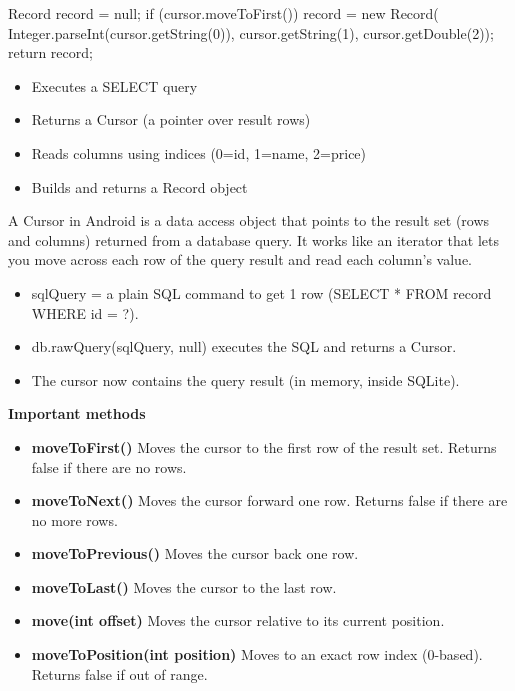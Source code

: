 \documentclass{report}
\begin{document}
\begin{itemize}
\begin{javacode}
{                    Record record = null;
                    if (cursor.moveToFirst())
                        record = new Record(
                            Integer.parseInt(cursor.getString(0)),
                            cursor.getString(1),
                            cursor.getDouble(2));
                    return record;
                }
            \end{javacode}
            \begin{itemize}
                \item Executes a SELECT query
                \item Returns a Cursor (a pointer over result rows)
                \item Reads columns using indices (0=id, 1=name, 2=price)
                \item Builds and returns a Record object
            \end{itemize}
            A Cursor in Android is a data access object that points to the result set (rows and columns) returned from a database query. It works like an iterator that lets you move across each row of the query result and read each column’s value.
            \begin{itemize}
                \item sqlQuery = a plain SQL command to get 1 row (SELECT * FROM record WHERE id = ?).
                \item db.rawQuery(sqlQuery, null) executes the SQL and returns a Cursor.
                \item The cursor now contains the query result (in memory, inside SQLite).
            \end{itemize}
            \textbf{Important methods}
            \begin{itemize}
                \item \textbf{moveToFirst()}	Moves the cursor to the first row of the result set. Returns false if there are no rows.
                \item \textbf{moveToNext()}	Moves the cursor forward one row. Returns false if there are no more rows.
                \item \textbf{moveToPrevious()}	Moves the cursor back one row.
                \item \textbf{moveToLast()}	Moves the cursor to the last row.
                \item \textbf{move(int offset)}	Moves the cursor relative to its current position.
                \item \textbf{moveToPosition(int position)}	Moves to an exact row index (0-based). Returns false if out of range.

\end{itemize}
\end{itemize}
\end{document}
